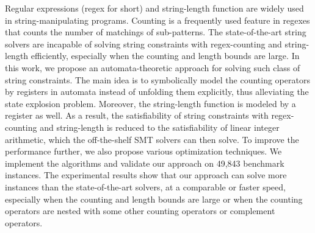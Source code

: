 
Regular expressions (regex for short) and string-length function are widely used in string-manipulating programs. Counting is a frequently used feature in regexes that counts the number of matchings of sub-patterns. 
The state-of-the-art string solvers are incapable of solving string constraints with regex-counting and string-length eﬀiciently, especially when the counting and length bounds are large. 
In this work, we propose an automata-theoretic approach for solving such class of string constraints. 
The main idea is to symbolically model the counting operators by registers in automata instead of unfolding them explicitly, thus alleviating the state explosion problem. Moreover, the string-length function is modeled by a register as well. 
As a result, the satisfiability of string constraints with regex-counting and string-length is reduced to the satisfiability of linear integer arithmetic, which the off-the-shelf SMT solvers can then solve. 
To improve the performance further, we also propose various optimization techniques.
We implement the algorithms and validate our approach on 49,843 benchmark instances. 
The experimental results show that our approach can solve more instances than the state-of-the-art solvers, at a comparable or faster speed, especially when the counting and length bounds are large or when the counting operators are nested with some other counting operators or complement operators. 
